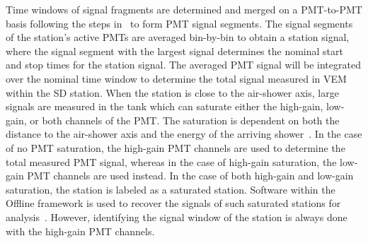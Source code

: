 
Time windows of signal fragments are determined and merged on a PMT-to-PMT basis following the steps in~\cite{auger_jinst2020_sdreconstruction} to form PMT signal segments.
The signal segments of the station's active PMTs are averaged bin-by-bin to obtain a station signal, where the signal segment with the largest signal determines the nominal start and stop times for the station signal.
The averaged PMT signal will be integrated over the nominal time window to determine the total signal measured in VEM within the SD station.
When the station is close to the air-shower axis, large signals are measured in the tank which can saturate either the high-gain, low-gain, or both channels of the PMT.
The saturation is dependent on both the distance to the air-shower axis and the energy of the arriving shower~\cite{auger_jinst2020_sdreconstruction}.
In the case of no PMT saturation, the high-gain PMT channels are used to determine the total measured PMT signal, whereas in the case of high-gain saturation, the low-gain PMT channels are used instead.
In the case of both high-gain and low-gain saturation, the station is labeled as a saturated station.
Software within the Offline framework is used to recover the signals of such saturated stations for analysis~\cite{auger_gap2008_saturation, auger_icrc2013_saturation}.
However, identifying the signal window of the station is always done with the high-gain PMT channels.

